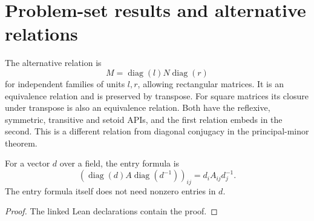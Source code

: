 \section{Problem-set results and alternative relations}

\begin{definition}

\label{def:two-sided}


\leanok

The alternative relation is
\[ M=\operatorname{diag}(l)N\operatorname{diag}(r) \]
for
independent families of units $l,r$, allowing rectangular matrices. It is an equivalence
relation and is preserved by transpose. For square matrices its closure under transpose
is also an equivalence relation. Both have the reflexive, symmetric, transitive and
setoid APIs, and the first relation embeds in the second.
This is a different relation from diagonal conjugacy in the principal-minor theorem.

\end{definition}

\begin{lemma}

\label{lem:diag-conj-entry}


\leanok

For a vector $d$ over a field, the entry formula is
\[ (\operatorname{diag}(d)A\operatorname{diag}(d^{-1}))_{ij}=d_iA_{ij}d_j^{-1}. \]
The entry formula itself does not need nonzero entries in $d$.

\end{lemma}

\begin{proof}

\leanok

The linked Lean declarations contain the proof.

\end{proof}

